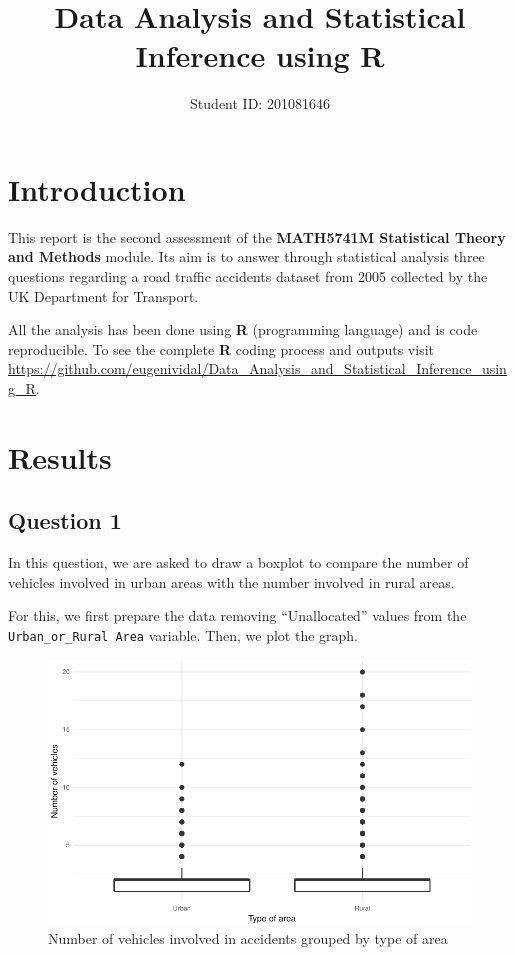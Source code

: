 \documentclass[]{article}
\title{Data Analysis and Statistical Inference using R}
\author{Student ID: 201081646}
\date{}
\begin{document}
\maketitle

\section{Introduction}\label{introduction}

This report is the second assessment of the \textbf{MATH5741M
Statistical Theory and Methods} module. Its aim is to answer through
statistical analysis three questions regarding a road traffic accidents
dataset from 2005 collected by the UK Department for Transport.

All the analysis has been done using \textbf{R} (programming language)
and is code reproducible. To see the complete \textbf{R} coding process
and outputs visit
\url{https://github.com/eugenividal/Data_Analysis_and_Statistical_Inference_using_R}.

\section{Results}\label{results}

\subsection{Question 1}\label{question-1}

In this question, we are asked to draw a boxplot to compare the number
of vehicles involved in urban areas with the number involved in rural
areas.

For this, we first prepare the data removing ``Unallocated'' values from
the \texttt{Urban\_or\_Rural\ Area} variable. Then, we plot the graph.

\begin{figure}[H]

{\centering \includegraphics{README_files/figure-latex/fig-1} 

}

\caption{Number of vehicles involved in accidents grouped by type of area}\label{fig:fig}
\end{figure}
\end{document}
